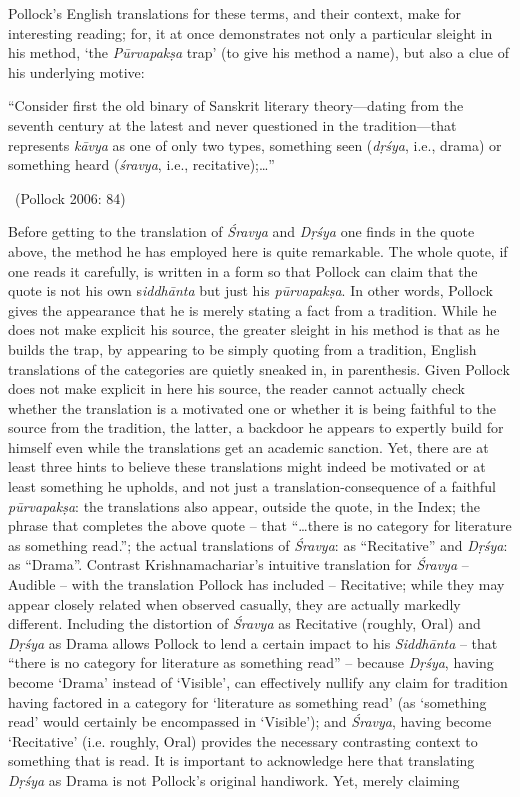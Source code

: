 Pollock’s English translations for these terms, and their context, make for interesting reading; for, it at once demonstrates not only a particular sleight in his method, ‘the \textit{Pūrvapakṣa} trap’ (to give his method a name), but also a clue of his underlying motive:

\begin{myquote}
“Consider first the old binary of Sanskrit literary theory—dating from the seventh century at the latest and never questioned in the tradition—that represents \textit{kāvya} as one of only two types, something seen (\textit{dṛśya}, i.e., drama) or something heard (\textit{śravya}, i.e., recitative);…” 

~\hfill (Pollock 2006: 84)
\end{myquote}

Before getting to the translation of \textit{Śravya} and \textit{Dṛśya} one finds in the quote above, the method he has employed here is quite remarkable. The whole quote, if one reads it carefully, is written in a form so that Pollock can claim that the quote is not his own s\textit{iddhānta} but just his \textit{pūrvapakṣa}. In other words, Pollock gives the appearance that he is merely stating a fact from a tradition. While he does not make explicit his source, the greater sleight in his method is that as he builds the trap, by appearing to be simply quoting from a tradition, English translations of the categories are quietly sneaked in, in parenthesis. Given Pollock does not make explicit in here his source, the reader cannot actually check whether the translation is a motivated one or whether it is being faithful to the source from the tradition, the latter, a backdoor he appears to expertly build for himself even while the translations get an academic sanction. Yet, there are at least three hints to believe these translations might indeed be motivated or at least something he upholds, and not just a translation-consequence of a faithful \textit{pūrvapakṣa}: the translations also appear, outside the quote, in the Index; the phrase that completes the above quote – that “…there is no category for literature as something read.”; the actual translations of \textit{Śravya}: as “Recitative” and \textit{Dṛśya}: as “Drama”. Contrast Krishnamachariar’s intuitive translation for \textit{Śravya} – Audible – with the translation Pollock has included – Recitative; while they may appear closely related when observed casually, they are actually markedly different. Including the distortion of \textit{Śravya} as Recitative (roughly, Oral) and \textit{Dṛśya} as Drama allows Pollock to lend a certain impact to his \textit{Siddhānta} – that “there is no category for literature as something read” – because \textit{Dṛśya}, having become ‘Drama’ instead of ‘Visible’, can effectively nullify any claim for tradition having factored in a category for ‘literature as something read’ (as ‘something read’ would certainly be encompassed in ‘Visible’); and \textit{Śravya}, having become ‘Recitative’ (i.e. roughly, Oral) provides the necessary contrasting context to something that is read. It is important to acknowledge here that translating \textit{Dṛśya} as Drama is not Pollock’s original handiwork. Yet, merely claiming 